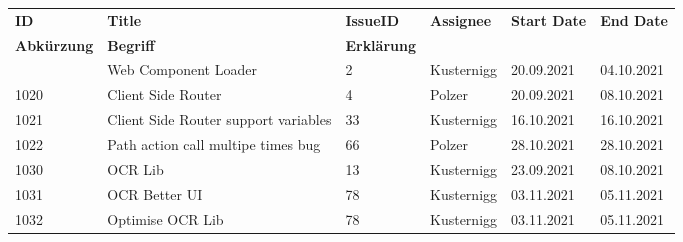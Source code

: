 \sectionauthor{}

\begin{longtable}{|p{}|p{}|p{}|p{}|p{}|p{}|} \hline
    \textbf{ID} & \textbf{Title} & \textbf{Issue\-ID} & \textbf{Assignee} & \textbf{Start Date} & \textbf{End \linebreak Date} \\ \hhline{|=|=|=|=|=|=|}
    \endfirsthead
    \hline
    \textbf{Abkürzung} & \textbf{Begriff} & \textbf{Erklärung} \\ \hhline{|=|=|=|}
    \endhead
    1010 & Web Component Loader & 2 & Kusternigg & 20.09.2021 & 04.10.2021 \\ \hline
    1020 & Client Side Router & 4 & Polzer & 20.09.2021 & 08.10.2021 \\ \hline
    1021 & Client Side Router support variables & 33 & Kusternigg & 16.10.2021 & 16.10.2021 \\ \hline
    1022 & Path action call multipe times bug & 66 & Polzer &  28.10.2021 & 28.10.2021 \\ \hline
    1030 & OCR Lib & 13 & Kusternigg & 23.09.2021 & 08.10.2021 \\ \hline
    1031 & OCR Better UI & 78 & Kusternigg & 03.11.2021 & 05.11.2021 \\ \hline
    1032 & Optimise OCR Lib & 78 & Kusternigg & 03.11.2021 & 05.11.2021 \\ \hline
\end{longtable}



